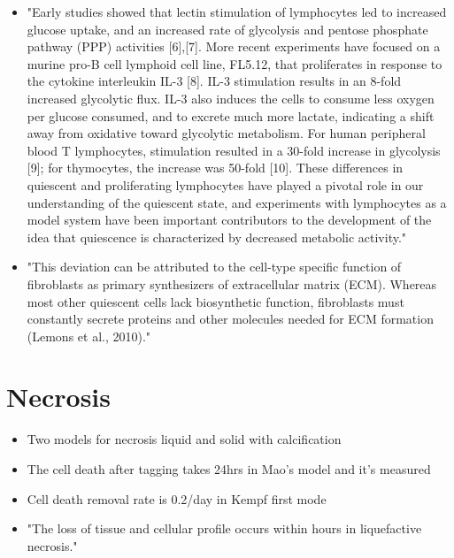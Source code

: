 \documentclass[11pt,a4paper]{article}
\begin{document}
\begin{itemize}
\item "Early studies showed that lectin stimulation of lymphocytes led to increased glucose uptake, and an increased rate of glycolysis and pentose phosphate pathway (PPP) activities [6],[7]. More recent experiments have focused on a murine pro-B cell lymphoid cell line, FL5.12, that proliferates in response to the cytokine interleukin IL-3 [8]. IL-3 stimulation results in an 8-fold increased glycolytic flux. IL-3 also induces the cells to consume less oxygen per glucose consumed, and to excrete much more lactate, indicating a shift away from oxidative toward glycolytic metabolism. For human peripheral blood T lymphocytes, stimulation resulted in a 30-fold increase in glycolysis [9]; for thymocytes, the increase was 50-fold [10]. These differences in quiescent and proliferating lymphocytes have played a pivotal role in our understanding of the quiescent state, and experiments with lymphocytes as a model system have been important contributors to the development of the idea that quiescence is characterized by decreased metabolic activity."\cite{Lemons2010}

\item "This deviation can be attributed to the cell-type specific function of fibroblasts as primary synthesizers of extracellular matrix (ECM). Whereas most other quiescent cells lack biosynthetic function, fibroblasts must constantly secrete proteins and other molecules needed for ECM formation (Lemons et al., 2010)."\cite{Marescal2020}

\end{itemize}

\section{Necrosis}
\begin{itemize}
\item Two models for necrosis liquid and solid with calcification \cite{Thim2010}\cite{YuMi2017}
\item The cell death after tagging takes 24hrs in Mao's model and it's measured \cite{Mao2018}
\item Cell death removal rate is 0.2/day in Kempf first mode \cite{Kempf2005}
\item "The loss of tissue and cellular profile occurs within hours in liquefactive necrosis." \cite{Adigun2024}
\end{itemize} 
\end{document}
